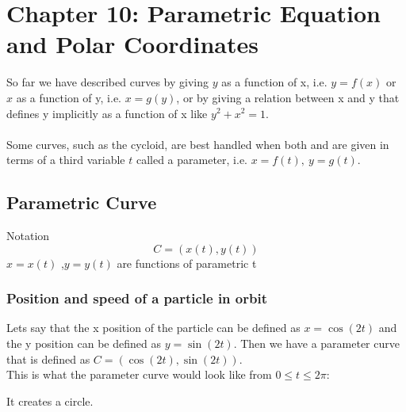 \documentclass[./MATH-115-Notes.tex]{subfiles}
\begin{document}
\chapter{Chapter 10: Parametric Equation and Polar Coordinates}
So far we have described curves by giving $y$ as a function of x, i.e. $y = f(x)$ or $x$ as a function of y, i.e. $x = g(y)$, or by giving a relation between x and y that defines y implicitly as a function of x like $y^2 + x^2 = 1$.
\\~\\ 
Some curves, such as the cycloid, are best handled when both  and  are given in terms of a third variable $t$ called a parameter, i.e. $x = f(t),\ y = g(t)$.
\section{Parametric Curve}
\begin{paperbox}{Notation}
    \begin{equation}
        C = (x(t), y(t))
    \end{equation}
    $ x = x(t) $ ,$ y = y(t) $ are functions of parametric t
\end{paperbox}

\subsection{Position and speed of a particle in orbit}
Lets say that the x position of the particle can be defined as $x = \cos(2t)$ and the y position can be defined as $ y = \sin(2t) $. Then we have a parameter curve that is defined as $C = (\cos(2t), \sin(2t)) $. \\
This is what the parameter curve would look like from $ 0 \leq t \leq 2\pi$:\\
\newpage
{}
It creates a circle.
\end{document}
